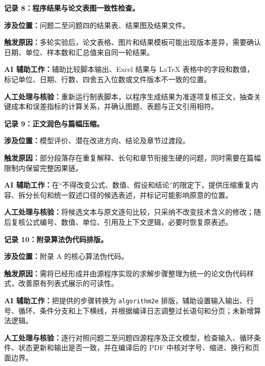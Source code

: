 \documentclass[withoutpreface,bwprint]{cumcmthesis}
\begin{document}
\par\medskip\noindent\textbf{记录 8：程序结果与论文表图一致性检查。}\par
\par\noindent\textbf{涉及位置：}问题二至问题四的结果表、结果图及结果文件。
\par\noindent\textbf{触发原因：}多轮实验后，论文表格、图片和结果模板可能出现版本差异，需要确认日期、单位、样本数和汇总值来自同一轮结果。
\par\noindent\textbf{AI 辅助工作：}辅助比较脚本输出、Excel 结果与 LaTeX 表格中的字段和数值，标记单位、日期、行数、四舍五入位数或文件版本不一致的位置。
\par\noindent\textbf{人工处理与核验：}重新运行制表脚本，以程序生成结果为准逐项复核正文，抽查关键成本和误差指标的计算关系，并确认图题、表题与正文引用相符。

\par\medskip\noindent\textbf{记录 9：正文润色与篇幅压缩。}\par
\par\noindent\textbf{涉及位置：}模型评价、潜在改进方向、结论及章节过渡段。
\par\noindent\textbf{触发原因：}部分段落存在重复解释、长句和章节衔接生硬的问题，同时需要在篇幅限制内保留完整因果链。
\par\noindent\textbf{AI 辅助工作：}在“不得改变公式、数值、假设和结论”的限定下，提供压缩重复内容、拆分长句和统一叙述口径的候选表述，并标记可能影响原意的位置。
\par\noindent\textbf{人工处理与核验：}将候选文本与原文逐句比较，只采纳不改变技术含义的修改；随后复核公式编号、数值、单位、引用及上下文逻辑，必要时恢复原表述。

\par\medskip\noindent\textbf{记录 10：附录算法伪代码排版。}\par
\par\noindent\textbf{涉及位置：}附录 A 的核心算法伪代码。
\par\noindent\textbf{触发原因：}需将已经形成并由源程序实现的求解步骤整理为统一的论文伪代码样式，改善原有列表式展示的可读性。
\par\noindent\textbf{AI 辅助工作：}把提供的步骤转换为 \texttt{algorithm2e} 排版，辅助设置输入输出、行号、循环、条件分支和上下横线，并根据编译日志调整过长语句和分页；未新增算法逻辑。
\par\noindent\textbf{人工处理与核验：}逐行对照问题二至问题四源程序及正文模型，检查输入、循环条件、状态更新和输出是否一致，并在编译后的 PDF 中核对字号、缩进、换行和页面边界。
\end{document}

